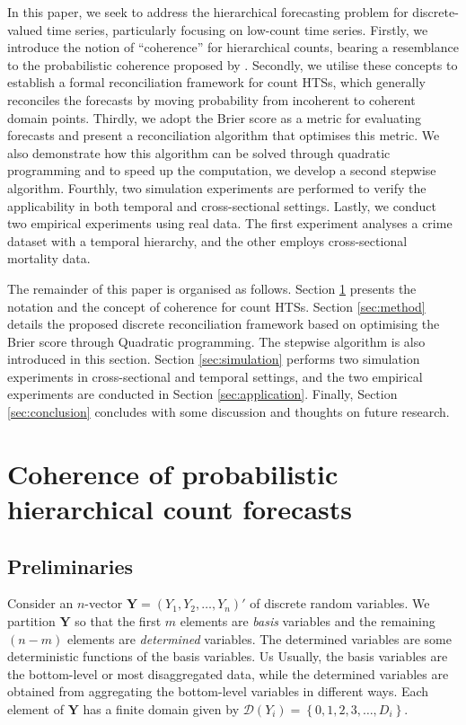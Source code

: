 \documentclass[a4paper,review,12pt,authoryear]{elsarticle}
\newcommand{\bY}{\mathbf{Y}}
\begin{document}
In this paper, we seek to address the hierarchical forecasting problem for discrete-valued time series, particularly focusing on low-count time series.
Firstly, we introduce the notion of ``coherence'' for hierarchical counts, 
bearing a resemblance to the probabilistic coherence proposed by \cite{panagiotelisProbabilisticForecastReconciliation2022}.
Secondly, we utilise these concepts to establish a formal reconciliation framework for count HTSs, which generally reconciles the forecasts by moving probability from incoherent to coherent domain points.
Thirdly, we adopt the Brier score as a metric for evaluating forecasts and present a reconciliation algorithm that optimises this metric. 
We also demonstrate how this algorithm can be solved through quadratic programming and to speed up the computation, we develop a second stepwise algorithm. 
Fourthly, two simulation experiments are performed to verify the applicability  in both temporal and cross-sectional settings. 
Lastly, we conduct two empirical experiments using real data. The first experiment analyses a crime dataset with a temporal hierarchy, and the other employs cross-sectional mortality data.

The remainder of this paper is organised as follows. 
Section \ref{sec:coherence} presents the notation and the concept of coherence for count HTSs.
Section \ref{sec:method} details the proposed discrete reconciliation framework based on optimising the Brier score through Quadratic programming. The stepwise algorithm is also introduced in this section. 
Section \ref{sec:simulation} performs two simulation experiments in cross-sectional and temporal settings, and the two empirical experiments are conducted in Section \ref{sec:application}. 
Finally, Section \ref{sec:conclusion} concludes with some discussion and thoughts on future research.



\section{Coherence of probabilistic hierarchical count forecasts}

\label{sec:coherence}

	
\subsection{Preliminaries}
Consider an $n$-vector $\bY=\left(Y_1,Y_2,\ldots,Y_n\right)'$ of discrete random variables.
We partition $\bY$ so that the first $m$ elements are \textit{basis} variables and the remaining $(n-m)$ elements are \textit{determined} variables.
The determined variables are some deterministic functions of the basis variables. Us
Usually, the basis variables are the bottom-level or most disaggregated data, while the determined variables are obtained from aggregating the bottom-level variables in different ways. 
Each element of $\bY$ has a finite domain given by $\mathcal{D}(Y_i)=\left\{0, 1,2,3,\dots,D_i\right\}$.
\end{document}
